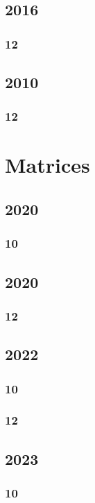 \documentclass[11pt]{book}
\begin{document}
\section{2016}
\subsection{12}



\section{2010}
\subsection{12}





\chapter{Matrices}
\section{2020}
\subsection{10}

\section{2020}
\subsection{12}

\section{2022}
\subsection{10}

\subsection{12}

\section{2023}
\subsection{10}

\end{document}
